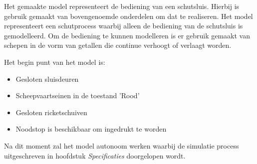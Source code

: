 \documentclass{article}
\begin{document}
Het gemaakte model representeert de bediening van een schutsluis. Hierbij is gebruik
gemaakt van bovengenoemde onderdelen om dat te realiseren. Het model representeert
een schutprocess waarbij alleen de bediening van de schutsluis is gemodelleerd. Om de
bediening te kunnen modelleren is er gebruik gemaakt van schepen in de vorm van 
getallen die continue verhoogt of verlaagt worden.

\noindent Het begin punt van het model is: 
    \begin{itemize}
        \item Gesloten sluisdeuren
        \item Scheepvaartseinen in de toestand 'Rood'
        \item Gesloten ricketschuiven
        \item Noodstop is beschikbaar om ingedrukt te worden
    \end{itemize}

\noindent Na dit moment zal het model autonoom werken waarbij de simulatie process uitgeschreven
in hoofdstuk \textit{Specificaties} doorgelopen wordt.


\newpage
\end{document}
